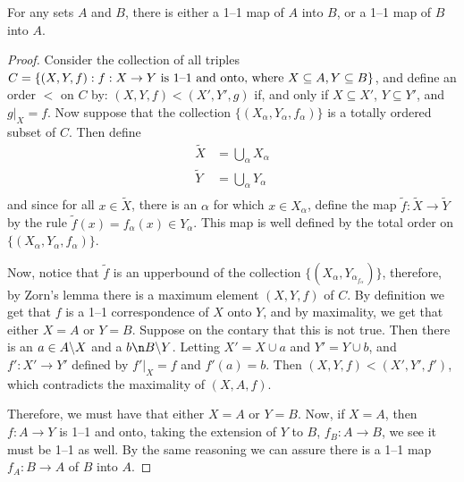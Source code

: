 \begin{theorem}\label{thm_3}
    For any sets $A$ and  $B$, there is either a 1--1 map of  $A$ into  $B$, or
    a 1--1 map of  $B$ into  $A$.
\end{theorem}
\begin{proof}
    Consider the collection of all triples $C=\{(X,Y,f) : f:X \rightarrow Y
    \text{ is 1--1 and onto, where }\\ X \subseteq A, Y \subseteq B\}$, and
    define an order $<$ on  $C$ by: $(X,Y,f)<(X',Y',g)$ if, and only if $X
    \subseteq X'$,  $Y \subseteq Y'$, and  $g|_X=f$. Now suppose that the
    collection  $\{(X_\alpha, Y_\alpha,f_\alpha)\}$ is a totally ordered subset
    of $C$. Then define
    \begin{align*}
        \tilde{X}   &=      \bigcup_{\alpha}{X_\alpha} \\
        \tilde{Y}   &=      \bigcup_{\alpha}{Y_\alpha} \\
    \end{align*}
    and since for all $x \in \tilde{X}$, there is an $\alpha$  for which $x \in
    X_\alpha$, define the map $\tilde{f}:\tilde{X} \rightarrow \tilde{Y}$ by the
    rule $\tilde{f}(x)=f_\alpha(x) \in Y_\alpha$. This map is well defined by
    the total order on $\{(X_\alpha,Y_\alpha,f_\alpha)\}$.

    Now, notice that $\tilde{f}$ is an upperbound of the collection
    $\{(X_\alpha,Y_\alpha_f_\alpha)\}$, therefore, by Zorn's lemma there is a
    maximum element $(X,Y,f)$ of $C$. By definition we get that $f$ is a 1--1
    correspondence of $X$ onto $Y$, and by maximality, we get that either $X=A$
    or $Y=B$. Suppose on the contary that this is not true. Then there is an  $a
    \in A\backslash X$ and a $b \n \com{B}{Y}$. Letting $X'=X \cup a$ and  $Y'=Y
    \cup b$, and  $f':X' \rightarrow Y'$ defined by $f'|_X=f$ and  $f'(a)=b$.
    Then $(X,Y,f)<(X',Y',f')$, which contradicts the maximality of $(X,A,f)$.

    Therefore, we must have that either $X=A$ or  $Y=B$. Now, if  $X=A$, then
    $f:A \rightarrow Y$ is 1--1 and onto, taking the extension of $Y$ to  $B$,
    $f_B:A \rightarrow B$, we see it must be 1--1 as well. By the same reasoning
    we can assure there is a 1--1 map $f_A:B \rightarrow A$ of $B$ into  $A$.
\end{proof}
